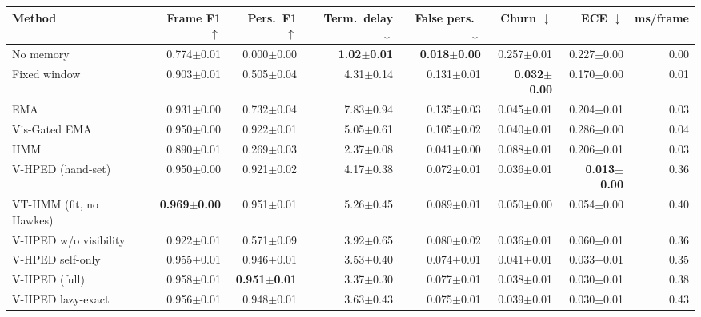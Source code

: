 \begin{tabular}{lrrrrrrr}
\toprule
Method & Frame F1 $\uparrow$ & Pers.\ F1 $\uparrow$ & Term.\ delay $\downarrow$ & False pers.\ $\downarrow$ & Churn $\downarrow$ & ECE $\downarrow$ & ms/frame \\
\midrule
No memory & 0.774$\pm$0.01 & 0.000$\pm$0.00 & \textbf{1.02$\pm$0.01} & \textbf{0.018$\pm$0.00} & 0.257$\pm$0.01 & 0.227$\pm$0.00 & 0.00 \\
Fixed window & 0.903$\pm$0.01 & 0.505$\pm$0.04 & 4.31$\pm$0.14 & 0.131$\pm$0.01 & \textbf{0.032$\pm$0.00} & 0.170$\pm$0.00 & 0.01 \\
EMA & 0.931$\pm$0.00 & 0.732$\pm$0.04 & 7.83$\pm$0.94 & 0.135$\pm$0.03 & 0.045$\pm$0.01 & 0.204$\pm$0.01 & 0.03 \\
Vis-Gated EMA & 0.950$\pm$0.00 & 0.922$\pm$0.01 & 5.05$\pm$0.61 & 0.105$\pm$0.02 & 0.040$\pm$0.01 & 0.286$\pm$0.00 & 0.04 \\
HMM & 0.890$\pm$0.01 & 0.269$\pm$0.03 & 2.37$\pm$0.08 & 0.041$\pm$0.00 & 0.088$\pm$0.01 & 0.206$\pm$0.01 & 0.03 \\
V-HPED (hand-set) & 0.950$\pm$0.00 & 0.921$\pm$0.02 & 4.17$\pm$0.38 & 0.072$\pm$0.01 & 0.036$\pm$0.01 & \textbf{0.013$\pm$0.00} & 0.36 \\
VT-HMM (fit, no Hawkes) & \textbf{0.969$\pm$0.00} & 0.951$\pm$0.01 & 5.26$\pm$0.45 & 0.089$\pm$0.01 & 0.050$\pm$0.00 & 0.054$\pm$0.00 & 0.40 \\
V-HPED w/o visibility & 0.922$\pm$0.01 & 0.571$\pm$0.09 & 3.92$\pm$0.65 & 0.080$\pm$0.02 & 0.036$\pm$0.01 & 0.060$\pm$0.01 & 0.36 \\
V-HPED self-only & 0.955$\pm$0.01 & 0.946$\pm$0.01 & 3.53$\pm$0.40 & 0.074$\pm$0.01 & 0.041$\pm$0.01 & 0.033$\pm$0.01 & 0.35 \\
V-HPED (full) & 0.958$\pm$0.01 & \textbf{0.951$\pm$0.01} & 3.37$\pm$0.30 & 0.077$\pm$0.01 & 0.038$\pm$0.01 & 0.030$\pm$0.01 & 0.38 \\
V-HPED lazy-exact & 0.956$\pm$0.01 & 0.948$\pm$0.01 & 3.63$\pm$0.43 & 0.075$\pm$0.01 & 0.039$\pm$0.01 & 0.030$\pm$0.01 & 0.43 \\
\bottomrule
\end{tabular}
